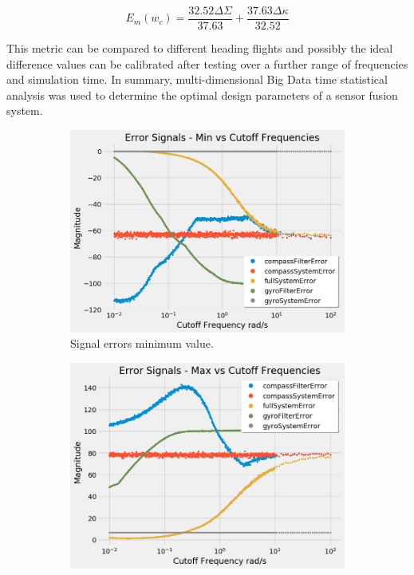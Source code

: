 \begin{equation}
    E_m(w_c) = \frac{32.52\Delta\Sigma}{37.63} + \frac{37.63 \Delta\kappa}{32.52}
    \label{eq:error_metic}
\end{equation}

This metric can be compared to different heading flights and possibly the ideal difference values can be calibrated after testing over a further range of frequencies and simulation time. In summary, multi-dimensional Big Data time statistical analysis was used to determine the optimal design parameters of a sensor fusion system.

\begin{figure}[H]
\begin{subfigure}{.5\textwidth}
  \centering
  \includegraphics[width=\linewidth, height=\paperheight/5]{img/iterable/errorsSignals/errorminSignals.png}  
  \caption{Signal errors minimum value.}
  \label{fig:error_min}
\end{subfigure}
\begin{subfigure}{.5\textwidth}
  \centering
  \includegraphics[width=\linewidth, height=\paperheight/5]{img/iterable/errorsSignals/errormaxSignals.png} 

\end{subfigure}
\end{figure}
